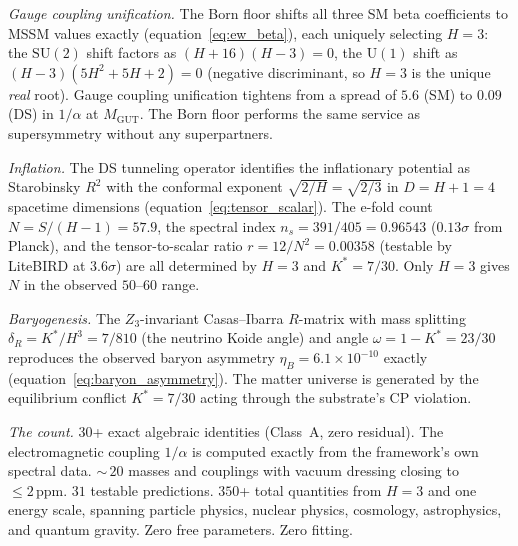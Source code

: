\documentclass[11pt,a4paper]{article}
\theoremstyle{definition}
\theoremstyle{remark}
\newcommand{\SU}{\mathrm{SU}}
\begin{document}
\emph{Gauge coupling unification.} The Born floor shifts all three SM beta coefficients to MSSM values exactly (equation~\ref{eq:ew_beta}), each uniquely selecting $H=3$: the $\SU(2)$ shift factors as $(H+16)(H-3)=0$, the $\mathrm{U}(1)$ shift as $(H-3)(5H^2+5H+2)=0$ (negative discriminant, so $H=3$ is the unique \emph{real} root). Gauge coupling unification tightens from a spread of $5.6$ (SM) to $0.09$ (DS) in $1/\alpha$ at $M_\mathrm{GUT}$. The Born floor performs the same service as supersymmetry without any superpartners.

\emph{Inflation.} The DS tunneling operator identifies the inflationary potential as Starobinsky $R^2$ with the conformal exponent $\sqrt{2/H}=\sqrt{2/3}$ in $D=H+1=4$ spacetime dimensions (equation~\ref{eq:tensor_scalar}). The e-fold count $N=S/(H-1)=57.9$, the spectral index $n_s=391/405=0.96543$ ($0.13\sigma$ from Planck), and the tensor-to-scalar ratio $r=12/N^2=0.00358$ (testable by LiteBIRD at $3.6\sigma$) are all determined by $H=3$ and $K^*=7/30$. Only $H=3$ gives $N$ in the observed $50$--$60$ range.

\emph{Baryogenesis.} The $Z_3$-invariant Casas--Ibarra $R$-matrix with mass splitting $\delta_R=K^*/H^3=7/810$ (the neutrino Koide angle) and angle $\omega=1-K^*=23/30$ reproduces the observed baryon asymmetry $\eta_B=6.1\times 10^{-10}$ exactly (equation~\ref{eq:baryon_asymmetry}). The matter universe is generated by the equilibrium conflict $K^*=7/30$ acting through the substrate's CP violation.

\emph{The count.} $30$+ exact algebraic identities (Class~A, zero residual). The electromagnetic coupling $1/\alpha$ is computed exactly from the framework's own spectral data. ${\sim}\,20$ masses and couplings with vacuum dressing closing to $\leq 2\,\mathrm{ppm}$. $31$ testable predictions. $350$+ total quantities from $H=3$ and one energy scale, spanning particle physics, nuclear physics, cosmology, astrophysics, and quantum gravity. Zero free parameters. Zero fitting.
\end{document}
